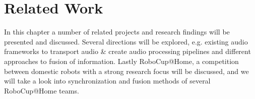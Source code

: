 
\chapter{Related Work}

In this chapter a number of related projects and research findings will be presented and discussed. 
Several directions will be explored, e.g. existing audio frameworks to transport audio \& create audio processing pipelines and different approaches to fusion of information.
Lastly RoboCup@Home, a competition between domestic robots with a strong research focus will be discussed, and we will take a look into synchronization and fusion methods of several RoboCup@Home teams.



